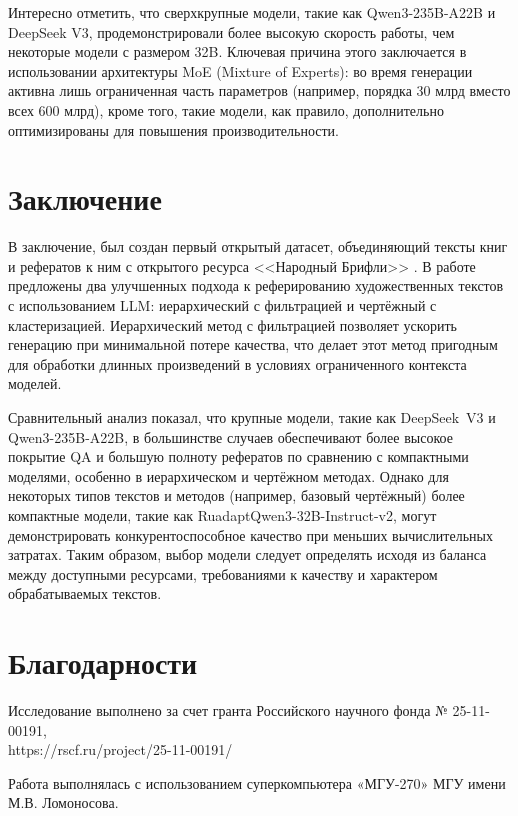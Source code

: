 \documentclass{superfri}
\begin{document}
Интересно отметить, что сверхкрупные модели, такие как Qwen3-235B-A22B и DeepSeek V3, продемонстрировали более высокую скорость работы, 
чем некоторые модели с размером 32B.
Ключевая причина этого заключается в использовании архитектуры MoE (Mixture of Experts):
во время генерации активна лишь ограниченная часть параметров (например, порядка 30 млрд вместо всех 600 млрд),
кроме того, такие модели, как правило, дополнительно оптимизированы для повышения производительности.


\section*{Заключение}
В заключение, был создан первый открытый датасет, объединяющий тексты книг и рефератов к ним с открытого ресурса <<Народный Брифли>> \cite{Briefly}. 
В работе предложены два улучшенных подхода к реферированию художественных текстов с использованием LLM: иерархический с фильтрацией и чертёжный с кластеризацией. 
Иерархический метод с фильтрацией позволяет ускорить генерацию при минимальной потере качества, 
что делает этот метод пригодным для обработки длинных произведений в условиях ограниченного контекста моделей.  

Сравнительный анализ показал, что крупные модели, такие как DeepSeek~V3 и Qwen3-\allowbreak 235B-\allowbreak A22B, в большинстве случаев обеспечивают более высокое покрытие QA и 
большую полноту рефератов по сравнению с компактными моделями, особенно в иерархическом и чертёжном методах. 
Однако для некоторых типов текстов и методов (например, базовый чертёжный) более компактные модели, такие как RuadaptQwen3-\allowbreak 32B-\allowbreak Instruct-\allowbreak v2, 
могут демонстрировать конкурентоспособное качество при меньших вычислительных затратах. 
Таким образом, выбор модели следует определять исходя из баланса между доступными ресурсами, требованиями к качеству и характером обрабатываемых текстов.

\section*{Благодарности}
Исследование выполнено за счет гранта Российского научного фонда № 25-11-00191, \\https://rscf.ru/project/25-11-00191/

Работа выполнялась с использованием суперкомпьютера «МГУ-270» МГУ имени М.В. Ломоносова.
\end{document}
